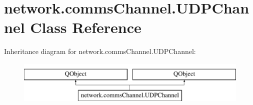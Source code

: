 \hypertarget{classnetwork_1_1commsChannel_1_1UDPChannel}{}\section{network.\+comms\+Channel.\+U\+D\+P\+Channel Class Reference}
\label{classnetwork_1_1commsChannel_1_1UDPChannel}
Inheritance diagram for network.\+comms\+Channel.\+U\+D\+P\+Channel\+:\begin{figure}[H]
\begin{center}
\leavevmode
\includegraphics[height=2.000000cm]{classnetwork_1_1commsChannel_1_1UDPChannel}
\end{center}
\end{figure}
